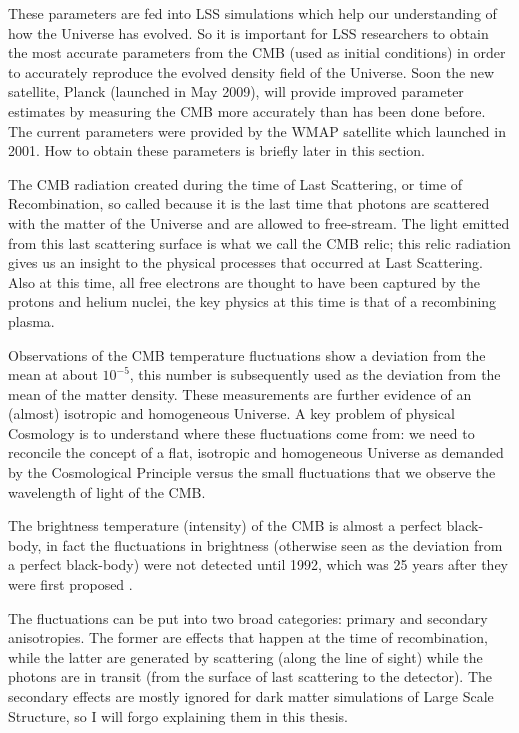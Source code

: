 These parameters are fed into LSS simulations which help our understanding of how the Universe has evolved. So it is important for LSS researchers to obtain the most accurate parameters from the CMB (used as initial conditions) in order to accurately reproduce the evolved density field of the Universe. Soon the new satellite, Planck (launched in May 2009), will provide improved parameter estimates by measuring the CMB more accurately than has been done before. The current parameters were provided by the WMAP satellite which launched in 2001. How to obtain these parameters is briefly later in this section.

The CMB radiation created during the time of Last Scattering, or time of Recombination, so called because it is the last time that photons are scattered with the matter of the Universe and are allowed to free-stream. The light emitted from this last scattering surface is what we call the CMB relic; this relic radiation gives us an insight to the physical processes that occurred at Last Scattering. Also at this time, all free electrons are thought to have been captured by the protons and helium nuclei, the key physics at this time is that of a recombining plasma. \citep{bib_pea, bib_lah, bib_baum}

Observations of the CMB temperature fluctuations show a deviation from the mean at about $10^{-5}$, this number is subsequently used as the deviation from the mean of the matter density. These measurements are further evidence of an (almost) isotropic and homogeneous Universe. A key problem of physical Cosmology is to understand where these fluctuations come from: we need to reconcile the concept of a flat, isotropic and homogeneous Universe as demanded by the Cosmological Principle versus the small fluctuations that we observe the wavelength of light of the CMB.

The brightness temperature (intensity) of the CMB is almost a perfect black-body, in fact the fluctuations in brightness (otherwise seen as the deviation from a perfect black-body) were not detected until 1992, which was 25 years after they were first proposed \citep{bib_pea}.

The fluctuations can be put into two broad categories: primary and secondary anisotropies. The former are effects that happen at the time of recombination, while the latter are generated by scattering (along the line of sight) while the photons are in transit (from the surface of last scattering to the detector). The secondary effects are mostly ignored for dark matter simulations of Large Scale Structure, so I will forgo explaining them in this thesis.

